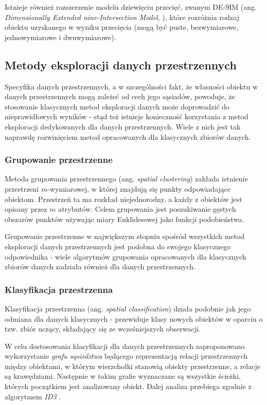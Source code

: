 \documentclass[12pt]{article}
\begin{document}
Istnieje również rozszerzenie modelu dziewięciu przecięć, zwanym DE-9IM (ang. \textit{Dimensionally Extended nine-Intersection Model}, \cite{9sec2}), które rozróżnia rodzaj obiektu uzyskanego w wyniku przecięcia (mogą być puste, bezwymiarowe, jednowymiarowe i dwuwymiarowe). 

\subsection{Metody eksploracji danych przestrzennych}

Specyfika danych przestrzennych, a w szczególności fakt, że własności obiektu w danych przestrzennych mogą zależeć od cech jego sąsiadów, powoduje, że stosowanie klasycznych metod eksploracji danych może doprowadzić do nieprawidłowych wyników \cite{klasykchuj1} \cite{klasykchuj2} - stąd też istnieje konieczność korzystania z metod eksploracji dedykowanych dla danych przestrzennych. Wiele z nich jest tak naprawdę rozwinięciem metod opracowanych dla klasycznych zbiorów danych.

\subsubsection{Grupowanie przestrzenne}

Metoda grupowania przestrzennego (ang. \textit{spatial clustering}) zakłada istnienie przestrzeni $m$-wymiarowej, w której znajdują się punkty odpowiadające obiektom. Przestrzeń ta ma rozkład niejednorodny, a każdy z obiektów jest opisany przez $m$ atrybutów. Celem grupowania jest poszukiwanie gęstych obszarów punktów używając miary Euklidesowej jako funkcji podobieństwa. 

Grupowanie przestrzenne w największym stopniu spośród wszystkich metod eksploracji danych przestrzennych jest podobna do swojego klasycznego odpowiednika - wiele algorytmów grupowania opracowanych dla klasycznych zbiorów danych zadziała również dla danych przestrzennych. 

\subsubsection{Klasyfikacja przestrzenna}

Klasyfikacja przestrzenna (ang. \textit{spatial classification}) działa podobnie jak jego odmiana dla danych klasycznych - przewiduje klasy nowych obiektów w oparciu o tzw. zbiór uczący, składający się ze wcześniejszych obserwacji.

W celu dostosowania klasyfikacji dla danych przestrzennych zaproponowano \cite{klasyfikacja} wykorzystanie \textit{grafu sąsiedztwa} będącego reprezentacją relacji przestrzennych między obiektami, w którym wierzchołki stanowią obiekty przestrzenne, a relacje są krawędziami. Następnie w takim grafie wyznaczane są wszystkie ścieżki, których początkiem jest analizowany obiekt. Dalej analiza przebiega zgodnie z algorytmem \textit{ID3} \cite{id3}.
\end{document}
